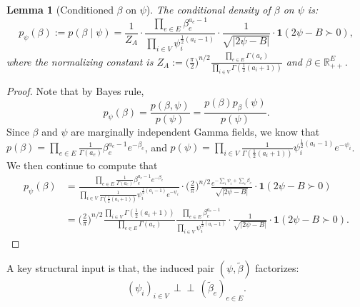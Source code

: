\documentclass[a4paper, 11pt]{article}
\newcommand{\ind}{\mathbf{1}}
\newtheorem{lem}[thm]{Lemma}
\begin{document}
\vspace{.5em}
\begin{lem}[Conditioned $\beta$ on $\psi$]
    \label{lem:p_psi_beta}
    The conditional density of $\beta$ on $\psi$ is:
    \begin{equation}
        \label{eqn:p_psi_beta}
        p_\psi(\beta) := p(\beta\mid \psi)
        = \frac{1}{Z_A}\cdot \frac{\prod_{e\in E}\beta_e^{a_e-1}}{\prod_{i\in V}\psi_i^{\frac{1}{2}(a_i-1)}}\cdot \frac{1}{\sqrt{|2\psi-B|}}\cdot \ind(2\psi-B\succ 0),
    \end{equation}
    where the normalizing constant is $Z_A:=\big(\frac{\pi}{2}\big)^{n/2}\frac{\prod_{e\in E}\Gamma(a_e)}{\prod_{i\in V}\Gamma(\frac{1}{2}(a_i+1))}$ and $\beta\in\mathbb{R}_{++}^E$.
\end{lem}
\begin{proof}
    Note that by Bayes rule,
    \[p_\psi(\beta)
        =\frac{p(\beta,\psi)}{p(\psi)}
        =\frac{p(\beta)p_\beta(\psi)}{p(\psi)}.\]
    Since $\beta$ and $\psi$ are marginally independent Gamma fields, we know that $p(\beta)=\prod_{e\in E}\frac{1}{\Gamma(a_e)}\beta_e^{a_e-1}e^{-\beta_e}$, and $p(\psi)=\prod_{i\in V}\frac{1}{\Gamma(\frac{1}{2}(a_i+1))}\psi_i^{\frac{1}{2}(a_i-1)}e^{-\psi_i}$. We then continue to compute that
    \begin{align*}
        p_\psi(\beta)
        &=\frac{\prod_{e\in E}\frac{1}{\Gamma(a_e)}\beta_e^{a_e-1}e^{-\beta_e}}{\prod_{i\in V}\frac{1}{\Gamma(\frac{1}{2}(a_i+1))}\psi_i^{\frac{1}{2}(a_i-1)}e^{-\psi_i}}\cdot \Big(\frac{2}{\pi}\Big)^{n/2}\frac{e^{-\sum_i \psi_i+\sum_e\beta_e}}{\sqrt{|2\psi-B|}}\cdot \ind(2\psi-B\succ 0)\\
        &=\Big(\frac{2}{\pi}\Big)^{n/2}\frac{\prod_{i\in V}\Gamma(\frac{1}{2}(a_i+1))}{\prod_{e\in E}\Gamma(a_e)}\frac{\prod_{e\in E}\beta_e^{a_e-1}}{\prod_{i\in V}\psi_i^{\frac{1}{2}(a_i-1)}}\cdot \frac{1}{\sqrt{|2\psi-B|}}\cdot \ind(2\psi-B\succ 0).
    \end{align*}
\end{proof}

A key structural input is that,
the induced pair $(\psi,\tilde\beta)$ factorizes:
\begin{equation}\label{eq:factorization}
(\psi_i)_{i\in V}\,\perp\!\!\!\perp\,(\tilde\beta_e)_{e\in E}.
\end{equation}
\end{document}
